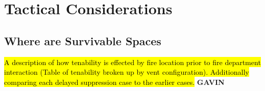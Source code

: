 \documentclass[12pt,oneside]{book}
\begin{document}





\clearpage

\chapter{Tactical Considerations}

\section{Where are Survivable Spaces}
\hl{A description of how tenability is effected by fire location prior to fire department interaction (Table of tenability broken up by vent configuration). Additionally comparing each delayed suppression case to the earlier cases.} \bf{GAVIN}
\end{document}
